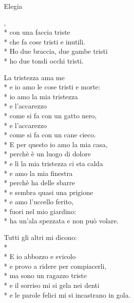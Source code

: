 \documentclass[12pt]{book}
\begin{document}
\begin{poem}{Elegia}{}
\begin{changemargin}{-1cm}{-2cm}
\settowidth{\versewidth}{non meno è ciò che meriti.}

\begin{altverse}
,\\*
con una faccia triste\\*
che fa cose tristi e inutili.\\*
Ho due braccia, due gambe tristi\\*
ho due tondi occhi tristi.
\end{altverse}

\begin{altverse}
La tristezza ama me\\*
e io amo le cose tristi e morte:\\*
io amo la mia tristezza\\*
e l'accarezzo\\*
come si fa con un gatto nero,\\*
e l'accarezzo\\*
come si fa con un cane cieco.\\*
E per questo io amo la mia casa,\\*
perchè è un luogo di dolore\\*
e lì la mia tristezza ci sta calda\\*
e amo la mia finestra\\*
perchè ha delle sbarre\\*
e sembra quasi una prigione\\*
e amo l'uccello ferito,\\*
fuori nel mio giardino:\\*
ha un'ala spezzata e non può volare.
\end{altverse}

\begin{altverse}
Tutti gli altri mi dicono:\\*
\\*
E io abbozzo e svicolo\\*
e provo a ridere per compiacerli,\\*
ma sono un ragazzo triste\\*
e il sorriso mi si gela nei denti\\*
e le parole felici mi si incastrano in gola.
\end{altverse}


\end{changemargin}
\end{poem}
\end{document}
